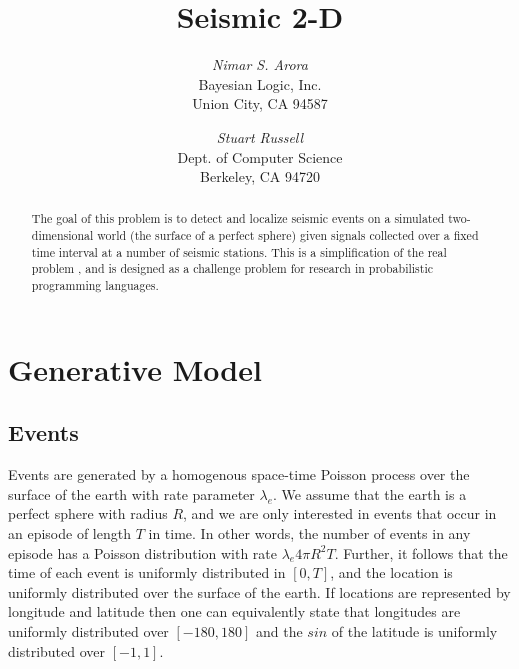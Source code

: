 \documentclass[12pt,letterpaper,onecolumn,oneside]{article}
\begin{document}
\title{Seismic 2-D}
\author{
\textit{Nimar S. Arora}\\
Bayesian Logic, Inc.\\
Union City, CA 94587
\and
\textit{Stuart Russell}\\
Dept. of Computer Science\\
Berkeley, CA 94720
}
\maketitle

\begin{abstract}
The goal of this problem is to detect and localize seismic events on a
simulated two-dimensional world (the surface of a perfect sphere) given
signals collected over a fixed time interval at a number of seismic
stations. This is a simplification of the real problem
\citep{Arora2013}, and is designed as a challenge problem for
research in probabilistic programming languages.
\end{abstract}

\section{Generative Model}

\subsection{Events}

Events are generated by a homogenous space-time Poisson process over the
surface of the earth with rate parameter $\lambda_e$. We assume that the
earth is a perfect sphere with radius $R$, and we are only interested in
events that occur in an episode of length $T$ in time. In other words,
the number of events in any episode has a Poisson distribution with rate
$\lambda_e 4 \pi R^2 T$.  Further, it follows that the time of each
event is uniformly distributed in $[0,T]$, and the location is uniformly
distributed over the surface of the earth. If locations are represented
by longitude and latitude then one can equivalently state that
longitudes are uniformly distributed over $[-180, 180]$ and the $sin$ of
the latitude is uniformly distributed over $[-1, 1]$.
\end{document}
